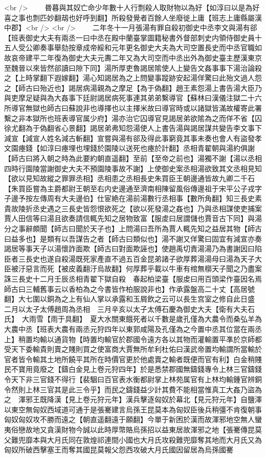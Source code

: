 <br />
　　昬暮與其奴亡命少年數十人行剽殺人取財物以為好【如淳曰以是為好喜之事也剽匹妙翻刼也好呼到翻】所殺發覺者百餘人坐廢徙上庸【班志上庸縣屬漢中郡】<br />
<br />
　　二年冬十一月張湯有罪自殺初御史中丞李文與湯有郤【班表御史大夫有兩丞一曰中丞在殿中蘭臺掌圖籍秘書外督部刺史内領侍御史員十五人受公卿奏事舉劾按章成帝綏和元年更名御史大夫為大司空置長史而中丞官職如故哀帝建平二年復為御史大夫元夀二年又為大司空而中丞出外為御史臺主歷漢東京至魏晉以來皆然郤讀曰隙下同】湯所厚吏魯謁居隂使人上變告文姦事事下湯治論殺之【上時掌翻下遐嫁翻】湯心知謁居為之上問變事蹤跡安起湯佯驚曰此殆文過人怨之【師古曰殆近也】謁居病湯親為之摩足【為于偽翻】趙王素怨湯上書告湯大臣乃與吏摩足疑與為大姦事下廷尉謁居病死事連其弟弟繫導官【蘇林曰漢儀注獄二十六所導官無獄也師古曰蘇說非也導擇也以主擇米故曰導官時或以諸獄皆滿故權寄此署繫之非本獄所也班表導官属少府】湯亦治它囚導官見謁居弟欲隂為之而佯不省【囚徐尤翻為于偽翻省心景翻】謁居弟弗知怨湯使人上書告湯與謁居謀共變告李文事下減宣【減宣人姓名減古斬翻】宣嘗與湯有郤及得此事窮竟其事未奏也會人有盜發孝文園瘞錢【如淳曰瘞埋也埋錢於園陵以送死也瘞於計翻】丞相青翟朝與湯約俱謝【師古曰將入朝之時為此要約朝直遥翻】至前【至帝之前也】湯獨不謝【湯以丞相四時行園陵當謝御史大夫不預園陵事故不謝】上使御史案丞相湯欲致其文丞相見知【欲以見知故縱之罪罪丞相】丞相患之丞相長史朱買臣王朝邊通皆故九卿二千石【朱買臣嘗為主爵都尉王朝至右内史邊通至濟南相陳留風俗傳邊祖于宋平公子戎字子邊予按左傳周有大夫邊伯】仕宦絶在湯前湯數行丞相事【數所角翻】知三長史素貴故陵折丞史遇之三長史皆怨恨欲死之【欲以死發湯之姦也】乃與丞相謀使吏捕案賈人田信等曰湯且欲奏請信輒先知之居物致富【服䖍曰居謂儲也賈音古下同】與湯分之事辭頗聞【師古曰聞於天子也】上問湯曰吾所為賈人輒先知之益居其物【師古曰益多也】是類有以吾謀告之者【師古曰類似也】湯不謝又佯驚曰固宜有減宣亦奏謁居等事天子以湯懷詐面欺【師古曰對面欺誣也】使趙禹切責湯湯乃為書謝因曰陷臣者三長史也遂自殺湯既死家產直不過五百金昆弟諸子欲厚葬湯湯母曰湯為天子大臣被汙惡言而死【被皮義翻汙烏故翻】何厚葬乎載以牛車有棺無槨天子聞之乃盡案誅三長史十二月壬辰丞相青翟下獄自殺　春起柏梁臺【服䖍曰用百頭梁作臺因名焉師古曰三輔舊事云以香柏為之今書皆作柏服說非也】作承露盤高二十丈【高居號翻】大七圍以銅為之上有仙人掌以承露和玉屑飲之云可以長生宫室之修自此日盛　二月以太子太傅趙周為丞相　三月辛亥以太子太傅石慶為御史大夫【衛有大夫石氏】　大雨雪【雨于具翻】　夏大水關東餓死者以千數是歲孔僅為大農令而桑弘羊為大農中丞【班表大農有兩丞元狩四年以東郭咸陽及孔僅為之今置中丞其位當在兩丞上】稍置均輸以通貨物【時置均輸官於郡國令遠方各以其物而灌輸置平凖於京師都受天下委輸貴則賣之賤則買之使富商大賈無所牟利杜佑曰漢武帝置均輸謂所當輸於官者皆令輸其土地所饒平其所在時價官更於他處賣之輸者既便而官有利】白金稍賤民不寶用竟廢之【鑄白金見上卷元狩四年】於是悉禁郡國無鑄錢專令上林三官鑄錢令天下非三官錢不得行【裴駰曰百官表水衡都尉掌上林苑属官有上林均輸鍾官辨銅令然則上林三官其是此三令乎】而民之鑄錢益少計其費不能相當惟真工大姦乃盜為之　渾邪王既降漢【見上卷元狩元年】漢兵擊逐匈奴於幕北【見元狩元年】自鹽澤以東空無匈奴西域道可通于是張騫建言烏孫王昆莫本為匈奴臣後兵稍彊不肯復朝事匈奴匈奴攻不勝而遠之【朝直遥翻遠于願翻】今單于新困於漢而故渾邪地空無人蠻夷俗戀故地又貪漢財物今誠以此時厚幣賂烏孫招以益東居故渾邪之地【張騫傳昆莫父難兜靡本與大月氏同在敦煌祁連間小國也大月氏攻殺難兜靡奪其地而大月氏又為匈奴所破西擊塞王而奪其國昆莫報父怨西攻破大月氏國因留居為烏孫國騫